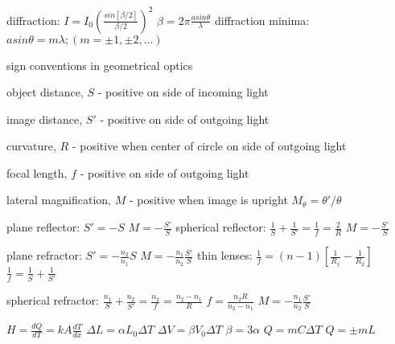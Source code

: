 \documentclass{exam}
\begin{document}
\noindent
diffraction: $I = I_0 \left(\frac{sin[\beta/2]}{\beta/2}  \right)^2$ \hspace{1mm} $\beta = 2\pi\frac{a sin\theta}{\lambda}$
diffraction minima: $a sin\theta=m\lambda; (m=\pm1, \pm2, ...)$

\noindent
sign conventions in geometrical optics 

object distance, $S$ - positive on side of incoming light

image distance, $S'$ - positive on side of outgoing light

curvature, $R$ - positive when center of circle on side of outgoing light

focal length, $f$ - positive on side of outgoing light

lateral magnification, $M$ - positive when image is upright   $M_\theta=\theta'/\theta$

\noindent
plane reflector: $S' = -S$ \hspace{3mm} $M=-\frac{S'}{S}$
spherical reflector: $\frac{1}{S} + \frac{1}{S'}=\frac{1}{f}=\frac{2}{R}$ \hspace{3mm} $M=-\frac{S'}{S}$

\noindent
plane refractor: $S'=-\frac{n_2}{n_1}S$ \hspace{3mm} $M=-\frac{n_1}{n_2}\frac{S'}{S}$
thin lenses: $\frac{1}{f}=(n-1)\left[\frac{1}{R_1}-\frac{1}{R_2}\right]$ \hspace{3mm} $\frac{1}{f}=\frac{1}{S}+\frac{1}{S'}$

\noindent
spherical refractor: $\frac{n_1}{S} + \frac{n_2}{S'}=\frac{n_2}{f}=\frac{n_2-n_1}{R}$
\hspace{4mm}
$f=\frac{n_2R}{n_2-n_1}$
\hspace{4mm}
$M=-\frac{n_1}{n_2}\frac{S'}{S}$

\noindent
$H=\frac{dQ}{dT}=kA\frac{dT}{dx}$
$\Delta L = \alpha L_0 \Delta T$
$\Delta V = \beta V_0 \Delta T$
$\beta=3\alpha$
$Q=m C \Delta T$
$Q=\pm mL$
\end{document}
